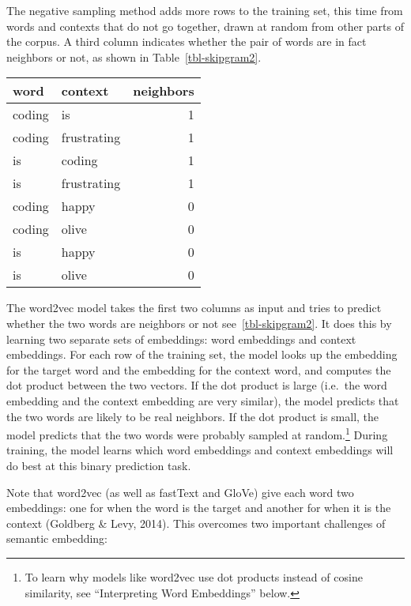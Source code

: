 \documentclass[
  man,
  floatsintext,
  longtable,
  nolmodern,
  notxfonts,
  notimes,
  colorlinks=true,linkcolor=blue,citecolor=blue,urlcolor=blue]{apa7}
\begin{document}
The negative sampling method adds more rows to the training set, this
time from words and contexts that do not go together, drawn at random
from other parts of the corpus. A third column indicates whether the
pair of words are in fact neighbors or not, as shown in
Table~\ref{tbl-skipgram2}.

\begin{table}

{\caption{{Example Skipgram Training Set With Negative
Sampling}{\label{tbl-skipgram2}}}
\vspace{-20pt}}

\begin{longtable}[]{@{}llr@{}}
\toprule\noalign{}
word & context & neighbors \\
\midrule\noalign{}
\endhead
\bottomrule\noalign{}
\endlastfoot
coding & is & 1 \\
coding & frustrating & 1 \\
is & coding & 1 \\
is & frustrating & 1 \\
coding & happy & 0 \\
coding & olive & 0 \\
is & happy & 0 \\
is & olive & 0 \\
\end{longtable}

\end{table}

The word2vec model takes the first two columns as input and tries to
predict whether the two words are neighbors or not
see~\ref{tbl-skipgram2}. It does this by learning two separate sets of
embeddings: word embeddings and context embeddings. For each row of the
training set, the model looks up the embedding for the target word and
the embedding for the context word, and computes the dot product between
the two vectors. If the dot product is large (i.e.~the word embedding
and the context embedding are very similar), the model predicts that the
two words are likely to be real neighbors. If the dot product is small,
the model predicts that the two words were probably sampled at
random.\footnote{To learn why models like word2vec use dot products
  instead of cosine similarity, see ``Interpreting Word Embeddings''
  below.} During training, the model learns which word embeddings and
context embeddings will do best at this binary prediction task.

Note that word2vec (as well as fastText and GloVe) give each word two
embeddings: one for when the word is the target and another for when it
is the context (Goldberg \& Levy, 2014). This overcomes two important
challenges of semantic embedding:
\end{document}
